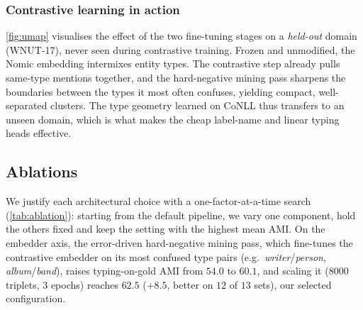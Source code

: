 \documentclass[pdflatex,sn-basic,Numbered]{sn-jnl}
\begin{document}
\subsubsection{Contrastive learning in action}
\autoref{fig:umap} visualises the effect of the two fine-tuning stages on a \emph{held-out} domain (WNUT-17), never seen during contrastive training.
Frozen and unmodified, the Nomic embedding intermixes entity types. The contrastive step already pulls same-type mentions together, and the hard-negative mining pass sharpens the boundaries between the types it most often confuses, yielding compact, well-separated clusters.
The type geometry learned on CoNLL thus transfers to an unseen domain, which is what makes the cheap label-name and linear typing heads effective.



\subsection{Ablations}
\label{sec:exp:ablations}
{
We justify each architectural choice with a one-factor-at-a-time search (\autoref{tab:ablation}): starting from the default pipeline, we vary one component, hold the others fixed and keep the setting with the highest mean AMI.
On the embedder axis, the error-driven hard-negative mining pass, which fine-tunes the contrastive embedder on its most confused type pairs (e.g.\ \emph{writer}/\emph{person}, \emph{album}/\emph{band}), raises typing-on-gold AMI from $54.0$ to $60.1$, and scaling it ($8000$ triplets, $3$ epochs) reaches $62.5$ ($+8.5$, better on $12$ of $13$ sets), our selected configuration.
\par}
\end{document}
